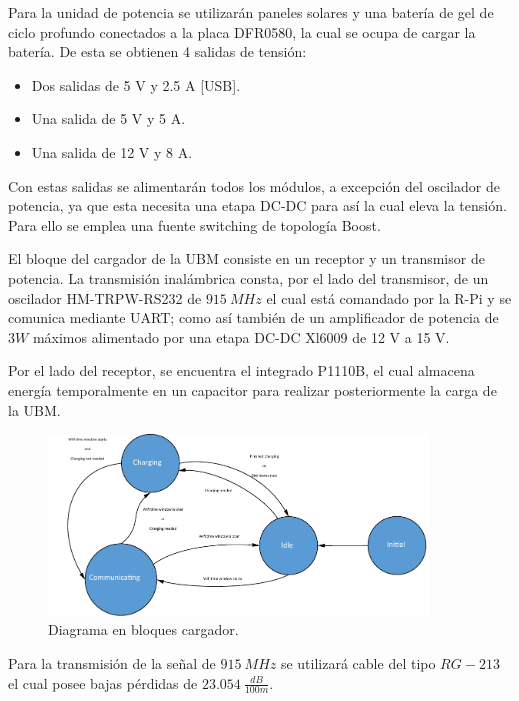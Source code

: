 
Para la unidad de potencia se utilizarán paneles solares y una batería de gel de ciclo profundo conectados a la placa DFR0580, la cual se ocupa de cargar la batería. De esta se obtienen 4 salidas de tensión:
\begin{itemize}
	\item Dos salidas de 5 V y 2.5 A [USB].
	\item Una salida de 5 V y 5 A.
	\item Una salida de 12 V y 8 A.
\end{itemize}

Con estas salidas se alimentarán todos los módulos, a excepción del oscilador de potencia, ya que esta necesita una etapa DC-DC para así la cual eleva la tensión. Para ello se emplea una fuente switching de topología Boost.


El bloque del cargador de la UBM consiste en un receptor y un transmisor de potencia. La transmisión inalámbrica consta, por el lado del transmisor, de un oscilador HM-TRPW-RS232 de $915 \ MHz$ el cual está comandado por la R-Pi y se comunica mediante UART; como así también de un amplificador de potencia de $3W$ máximos alimentado por una etapa DC-DC Xl6009 de 12 V a 15 V.

Por el lado del receptor, se encuentra el integrado P1110B, el cual almacena energía temporalmente en un capacitor para realizar posteriormente la carga de la UBM.

\begin{figure}[H]
	\centering	
	\includegraphics[width=0.9\textwidth, page=8]{ImagenesIngenieria de Detalle/FlowChart.pdf}
	\caption{Diagrama en bloques cargador.}
	\label{fig:diagrama_hardware_antenas}
\end{figure}

Para la transmisión de la señal de $915 \ MHz$ se utilizará cable del tipo $RG-213$ el cual posee bajas pérdidas de $23.054 \ \frac{dB}{100m}$.

